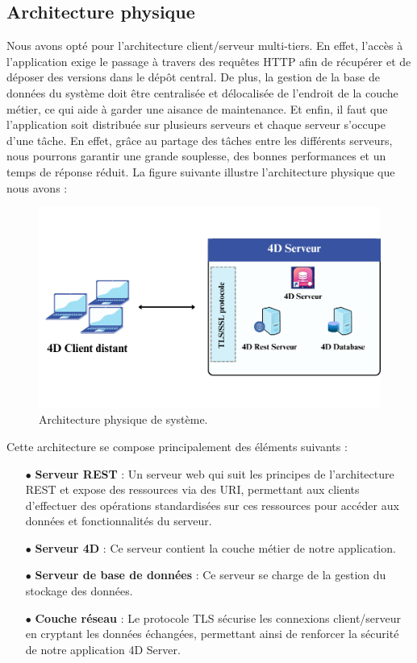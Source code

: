 \subsection{Architecture physique}

Nous avons opté pour l’architecture client/serveur multi-tiers. En effet, l’accès à l’application exige le passage à
travers des requêtes HTTP afin de récupérer et de déposer des versions dans le dépôt
central. De plus, la gestion de la base de données du système doit être centralisée et délocalisée de l’endroit de la couche métier, ce qui aide à garder une aisance de maintenance.
Et enfin, il faut que l’application soit distribuée sur plusieurs serveurs et chaque serveur
s’occupe d’une tâche. En effet, grâce au partage des tâches entre les différents serveurs,
nous pourrons garantir une grande souplesse, des bonnes performances et un temps de
réponse réduit. La figure suivante illustre l’architecture physique que nous avons :

\begin{figure}[H]
    \centering
    \includegraphics[width=15cm]{Figures/architecturePhysique.png}
    \caption{Architecture physique de système.}
\end{figure}

Cette architecture se compose principalement des éléments suivants :

\begin{itemize}
    \item[$\bullet$] \textbf{Serveur REST} : Un serveur web qui suit les principes de l'architecture REST et expose des ressources via des URI, permettant aux clients d'effectuer des opérations standardisées sur ces ressources pour accéder aux données et fonctionnalités du serveur.
    \item[$\bullet$] \textbf{Serveur 4D} : Ce serveur contient la couche métier de notre application.
    \item[$\bullet$] \textbf{Serveur de base de données} : Ce serveur se charge de la gestion du stockage des données.
    \item[$\bullet$] \textbf{Couche réseau} : Le protocole TLS sécurise les connexions client/serveur en cryptant les données échangées, permettant ainsi de renforcer la sécurité de notre application 4D Server.
\end{itemize}

